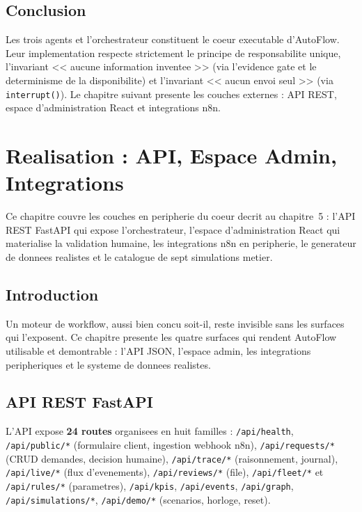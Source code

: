 \documentclass[12pt,a4paper,openany]{report}
\begin{document}
\section{Conclusion}

Les trois agents et l'orchestrateur constituent le coeur executable d'AutoFlow. Leur implementation respecte strictement le principe de responsabilite unique, l'invariant << aucune information inventee >> (via l'evidence gate et le determinisme de la disponibilite) et l'invariant << aucun envoi seul >> (via \texttt{interrupt()}). Le chapitre suivant presente les couches externes : API REST, espace d'administration React et integrations n8n.

\chapter{Realisation : API, Espace Admin, Integrations}\label{chap:realisation2}
Ce chapitre couvre les couches en peripherie du coeur decrit au chapitre~5 : l'API REST FastAPI qui expose l'orchestrateur, l'espace d'administration React qui materialise la validation humaine, les integrations n8n en peripherie, le generateur de donnees realistes et le catalogue de sept simulations metier.

\section{Introduction}
Un moteur de workflow, aussi bien concu soit-il, reste invisible sans les surfaces qui l'exposent. Ce chapitre presente les quatre surfaces qui rendent AutoFlow utilisable et demontrable : l'API JSON, l'espace admin, les integrations peripheriques et le systeme de donnees realistes.

\section{API REST FastAPI}

L'API expose \textbf{24 routes} organisees en huit familles : \texttt{/api/health}, \texttt{/api/public/*} (formulaire client, ingestion webhook n8n), \texttt{/api/requests/*} (CRUD demandes, decision humaine), \texttt{/api/trace/*} (raisonnement, journal), \texttt{/api/live/*} (flux d'evenements), \texttt{/api/reviews/*} (file), \texttt{/api/fleet/*} et \texttt{/api/rules/*} (parametres), \texttt{/api/kpis}, \texttt{/api/events}, \texttt{/api/graph}, \texttt{/api/simulations/*}, \texttt{/api/demo/*} (scenarios, horloge, reset).
\end{document}
